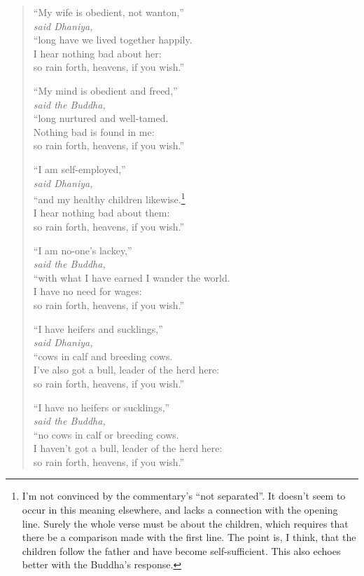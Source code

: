 \documentclass[12pt,openany]{book}%
\newcommand*{\scspeaker}[1]{\hspace{2em}\textit{#1}}
\begin{document}
\begin{verse}
“My wife is obedient, not wanton,” \\
\scspeaker{said Dhaniya, }\\
“long have we lived together happily. \\
I hear nothing bad about her: \\
so rain forth, heavens, if you wish.” 

“My mind is obedient and freed,” \\
\scspeaker{said the Buddha, }\\
“long nurtured and well-tamed. \\
Nothing bad is found in me: \\
so rain forth, heavens, if you wish.” 

“I am self-employed,” \\
\scspeaker{said Dhaniya, }\\
“and my healthy children likewise.\footnote{I’m not convinced by the commentary’s “not separated”. It doesn’t seem to occur in this meaning elsewhere, and lacks a connection with the opening line. Surely the whole verse must be about the children, which requires that there be a comparison made with the first line. The point is, I think, that the children follow the father and have become self-sufficient. This also echoes better with the Buddha’s response. } \\
I hear nothing bad about them: \\
so rain forth, heavens, if you wish.” 

“I am no-one’s lackey,” \\
\scspeaker{said the Buddha, }\\
“with what I have earned I wander the world. \\
I have no need for wages: \\
so rain forth, heavens, if you wish.” 

“I have heifers and sucklings,” \\
\scspeaker{said Dhaniya, }\\
“cows in calf and breeding cows. \\
I’ve also got a bull, leader of the herd here: \\
so rain forth, heavens, if you wish.” 

“I have no heifers or sucklings,” \\
\scspeaker{said the Buddha, }\\
“no cows in calf or breeding cows. \\
I haven’t got a bull, leader of the herd here: \\
so rain forth, heavens, if you wish.” 


\end{verse}
\end{document}
